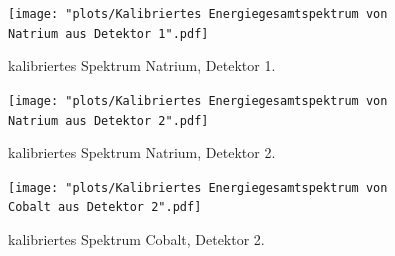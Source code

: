 \documentclass[%
aps,
onecolumn,
11pt,
tightenlines,
nofootinbib,
superscriptaddress,
floatfix,
prd,
]{revtex4-2}
\begin{document}
\begin{figure}		
	\texttt{[image: "plots/Kalibriertes Energiegesamtspektrum von Natrium aus Detektor 1".pdf]}
	\caption{kalibriertes Spektrum Natrium, Detektor 1.}
	\label{fig:calibratedsodium1}
\end{figure}
\begin{figure}		
	\texttt{[image: "plots/Kalibriertes Energiegesamtspektrum von Natrium aus Detektor 2".pdf]}
	\caption{kalibriertes Spektrum Natrium, Detektor 2.}
\end{figure}
\begin{figure}		
	\texttt{[image: "plots/Kalibriertes Energiegesamtspektrum von Cobalt aus Detektor 2".pdf]}
	\caption{kalibriertes Spektrum Cobalt, Detektor 2.}
	\label{fig:calibratedcobalt2}
\end{figure}
\end{document}
